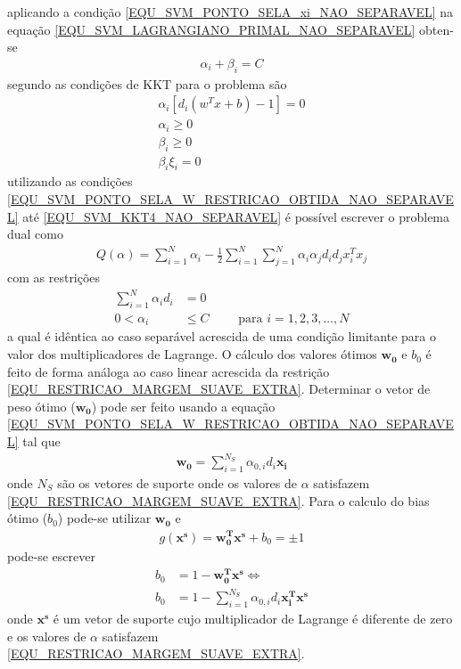 aplicando a condição \eqref{EQU_SVM_PONTO_SELA_xi_NAO_SEPARAVEL} na equação \eqref{EQU_SVM_LAGRANGIANO_PRIMAL_NAO_SEPARAVEL} obten-se
\begin{align}
\alpha_{i}+\beta_{i} = C \label{EQU_SVM_PONTO_SELA_xi_RESTRICAO_OBTIDA_NAO_SEPARAVEL}
\end{align}
segundo  as condições de KKT para o problema são
\begin{align}
\alpha_{i}[d_{i}(w^{T}x + b) - 1] = 0 \label{EQU_SVM_KKT1_NAO_SEPARAVEL}\\
\alpha_{i} \geq 0 \label{EQU_SVM_KKT2_NAO_SEPARAVEL}\\
\beta_{i} \geq 0 \label{EQU_SVM_KKT3_NAO_SEPARAVEL}\\
\beta_{i}\xi_{i} = 0 \label{EQU_SVM_KKT4_NAO_SEPARAVEL}
\end{align}
utilizando as condições \eqref{EQU_SVM_PONTO_SELA_W_RESTRICAO_OBTIDA_NAO_SEPARAVEL} até \eqref{EQU_SVM_KKT4_NAO_SEPARAVEL} é possível escrever o problema dual como
\begin{align}
Q(\alpha) = \sum\limits_{i=1}^{N} \alpha_{i} - \frac{1}{2} \sum\limits_{i=1}^{N} \sum\limits_{j=1}^{N} \alpha_{i}\alpha_{j}d_{i}d_{j}x_{i}^{T}x_{j} \label{EQU_SVM_OBJETIVO_NAO_SEPARAVEL_DUAL}
\end{align}
com as restrições
\begin{align}
\sum\limits_{i=1}^{N} \alpha_{i}d_{i} &= 0 \\
0 < \alpha_{i} &\leq C	\qquad \textrm{ para } i = 1, 2, 3, \ldots, N \label{EQU_RESTRICAO_MARGEM_SUAVE_EXTRA}
\end{align}
a qual é idêntica ao caso separável acrescida de uma condição limitante para o valor dos multiplicadores de Lagrange. O cálculo dos valores ótimos \(\mathbf{w_{0}}\) e \(b_{0}\) é feito de forma análoga ao caso linear acrescida da restrição \eqref{EQU_RESTRICAO_MARGEM_SUAVE_EXTRA}. Determinar o vetor de peso ótimo (\(\mathbf{w_{0}}\)) pode ser feito usando a equação \eqref{EQU_SVM_PONTO_SELA_W_RESTRICAO_OBTIDA_NAO_SEPARAVEL} tal que
\begin{align}
\mathbf{w_{0}} = \sum\limits_{i=1}^{N_{S}} \alpha_{0,i}d_{i}\mathbf{x_{i}} \label{EQU_SVM_W_OTIMO_MARGEM_SUAVE}
\end{align}
onde \(N_{S}\) são os vetores de suporte onde os valores de \(\alpha\) satisfazem \eqref{EQU_RESTRICAO_MARGEM_SUAVE_EXTRA}. Para o calculo do bias ótimo (\(b_{0}\)) pode-se utilizar \(\mathbf{w_{0}}\) e 
\begin{align}
g(\mathbf{x^{s}}) = \mathbf{w_{0}^{T}}\mathbf{x^{s}} + b_{0} = \pm 1
\end{align}
pode-se escrever
\begin{align}
b_{0} &= 1 - \mathbf{w_{0}^{T}}\mathbf{x^{s}} \Leftrightarrow \\
b_{0} &= 1 - \sum\limits_{i=1}^{N_{S}} \alpha_{0,i}d_{i}\mathbf{x_{i}^{T}}\mathbf{x^{s}} 
\end{align}
onde \(\mathbf{x^{s}}\) é um vetor de suporte cujo multiplicador de Lagrange é diferente de zero e os valores de \(\alpha\) satisfazem \eqref{EQU_RESTRICAO_MARGEM_SUAVE_EXTRA}.

